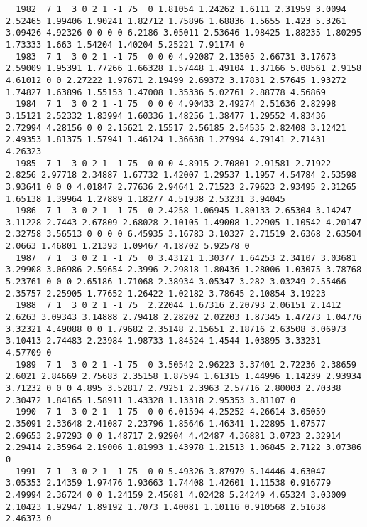 \begin{landscape}
{\begin{verbatim}
  1982  7 1  3 0 2 1 -1 75  0 1.81054 1.24262 1.6111 2.31959 3.0094 2.52465 1.99406 1.90241 1.82712 1.75896 1.68836 1.5655 1.423 5.3261 3.09426 4.92326 0 0 0 0 6.2186 3.05011 2.53646 1.98425 1.88235 1.80295 1.73333 1.663 1.54204 1.40204 5.25221 7.91174 0
  1983  7 1  3 0 2 1 -1 75  0 0 0 4.92087 2.13505 2.66731 3.17673 2.59009 1.95391 1.77266 1.66328 1.57448 1.49104 1.37166 5.08561 2.9158 4.61012 0 0 2.27222 1.97671 2.19499 2.69372 3.17831 2.57645 1.93272 1.74827 1.63896 1.55153 1.47008 1.35336 5.02761 2.88778 4.56869
  1984  7 1  3 0 2 1 -1 75  0 0 0 4.90433 2.49274 2.51636 2.82998 3.15121 2.52332 1.83994 1.60336 1.48256 1.38477 1.29552 4.83436 2.72994 4.28156 0 0 2.15621 2.15517 2.56185 2.54535 2.82408 3.12421 2.49353 1.81375 1.57941 1.46124 1.36638 1.27994 4.79141 2.71431 4.26323
  1985  7 1  3 0 2 1 -1 75  0 0 0 4.8915 2.70801 2.91581 2.71922 2.8256 2.97718 2.34887 1.67732 1.42007 1.29537 1.1957 4.54784 2.53598 3.93641 0 0 0 4.01847 2.77636 2.94641 2.71523 2.79623 2.93495 2.31265 1.65138 1.39964 1.27889 1.18277 4.51938 2.53231 3.94045
  1986  7 1  3 0 2 1 -1 75  0 2.4258 1.06945 1.80133 2.65304 3.14247 3.11228 2.7443 2.67809 2.68028 2.10105 1.49008 1.22905 1.10542 4.20147 2.32758 3.56513 0 0 0 0 6.45935 3.16783 3.10327 2.71519 2.6368 2.63504 2.0663 1.46801 1.21393 1.09467 4.18702 5.92578 0
  1987  7 1  3 0 2 1 -1 75  0 3.43121 1.30377 1.64253 2.34107 3.03681 3.29908 3.06986 2.59654 2.3996 2.29818 1.80436 1.28006 1.03075 3.78768 5.23761 0 0 0 2.65186 1.71068 2.38934 3.05347 3.282 3.03249 2.55466 2.35757 2.25905 1.77652 1.26422 1.02182 3.78645 2.10854 3.19223
  1988  7 1  3 0 2 1 -1 75  2.22044 1.67316 2.20793 2.06151 2.1412 2.6263 3.09343 3.14888 2.79418 2.28202 2.02203 1.87345 1.47273 1.04776 3.32321 4.49088 0 0 1.79682 2.35148 2.15651 2.18716 2.63508 3.06973 3.10413 2.74483 2.23984 1.98733 1.84524 1.4544 1.03895 3.33231  4.57709 0
  1989  7 1  3 0 2 1 -1 75  0 3.50542 2.96223 3.37401 2.72236 2.38659 2.6021 2.84669 2.75683 2.35158 1.87594 1.61315 1.44996 1.14239 2.93934 3.71232 0 0 0 4.895 3.52817 2.79251 2.3963 2.57716 2.80003 2.70338 2.30472 1.84165 1.58911 1.43328 1.13318 2.95353 3.81107 0
  1990  7 1  3 0 2 1 -1 75  0 0 6.01594 4.25252 4.26614 3.05059 2.35091 2.33648 2.41087 2.23796 1.85646 1.46341 1.22895 1.07577 2.69653 2.97293 0 0 1.48717 2.92904 4.42487 4.36881 3.0723 2.32914 2.29414 2.35964 2.19006 1.81993 1.43978 1.21513 1.06845 2.7122 3.07386 0
  1991  7 1  3 0 2 1 -1 75  0 0 5.49326 3.87979 5.14446 4.63047 3.05353 2.14359 1.97476 1.93663 1.74408 1.42601 1.11538 0.916779 2.49994 2.36724 0 0 1.24159 2.45681 4.02428 5.24249 4.65324 3.03009 2.10423 1.92947 1.89192 1.7073 1.40081 1.10116 0.910568 2.51638 2.46373 0

\end{verbatim}}
\end{landscape}
